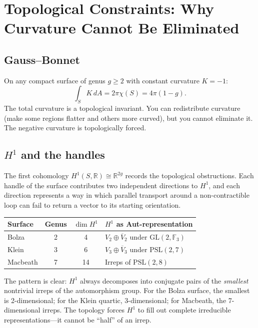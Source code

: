 \documentclass[11pt,a4paper]{article}
\begin{document}
\section{Topological Constraints: Why Curvature Cannot Be Eliminated}

\subsection{Gauss--Bonnet}

On any compact surface of genus $g \geq 2$ with constant curvature $K = -1$:
\[
  \int_S K\, dA = 2\pi\chi(S) = 4\pi(1 - g).
\]
The total curvature is a topological invariant. You can redistribute curvature
(make some regions flatter and others more curved), but you cannot eliminate it.
The negative curvature is topologically forced.

\subsection{$H^1$ and the handles}

The first cohomology $H^1(S, \mathbb{R}) \cong \mathbb{R}^{2g}$ records the
topological obstructions. Each handle of the surface contributes two
independent directions to $H^1$, and each direction represents a way in which
parallel transport around a non-contractible loop can fail to return a vector
to its starting orientation.

\medskip
\begin{center}
\renewcommand{\arraystretch}{1.3}
\begin{tabular}{@{}lccl@{}}
\toprule
\textbf{Surface} & Genus & $\dim H^1$ & $H^1$ as Aut-representation \\
\midrule
Bolza & 2 & 4 & $V_2 \oplus \overline{V}_2$ under $\mathrm{GL}(2,\mathbb{F}_3)$ \\
Klein & 3 & 6 & $V_3 \oplus \overline{V}_3$ under $\mathrm{PSL}(2,7)$ \\
Macbeath & 7 & 14 & Irreps of $\mathrm{PSL}(2,8)$ \\
\bottomrule
\end{tabular}
\end{center}

\medskip
The pattern is clear: $H^1$ always decomposes into conjugate pairs of the
\emph{smallest} nontrivial irreps of the automorphism group. For the Bolza
surface, the smallest is 2-dimensional; for the Klein quartic,
3-dimensional; for Macbeath, the 7-dimensional irreps. The topology forces $H^1$
to fill out complete irreducible representations---it cannot be ``half'' of an
irrep.
\end{document}
